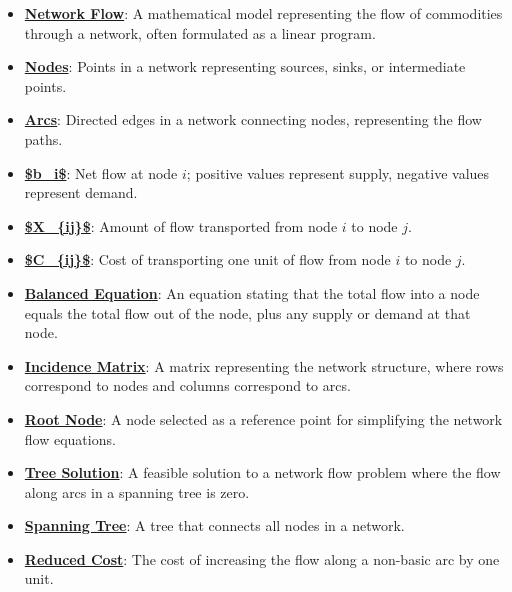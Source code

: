 \documentclass{article}%
\begin{document}
\begin{itemize}[leftmargin=*]%
\item \href{https://www.math.purdue.edu/~yipn/421//2024-11-05-NetFlows.pdf#page=1}{\textbf{Network Flow}}: A mathematical model representing the flow of commodities through a network, often formulated as a linear program.%
\item \href{https://www.math.purdue.edu/~yipn/421//2024-11-05-NetFlows.pdf#page=1}{\textbf{Nodes}}: Points in a network representing sources, sinks, or intermediate points.%
\item \href{https://www.math.purdue.edu/~yipn/421//2024-11-05-NetFlows.pdf#page=1}{\textbf{Arcs}}: Directed edges in a network connecting nodes, representing the flow paths.%
\item \href{https://www.math.purdue.edu/~yipn/421//2024-11-05-NetFlows.pdf#page=2}{\textbf{\$b\_i\$}}: Net flow at node $i$; positive values represent supply, negative values represent demand.%
\item \href{https://www.math.purdue.edu/~yipn/421//2024-11-05-NetFlows.pdf#page=2}{\textbf{\$X\_\{ij\}\$}}: Amount of flow transported from node $i$ to node $j$.%
\item \href{https://www.math.purdue.edu/~yipn/421//2024-11-05-NetFlows.pdf#page=2}{\textbf{\$C\_\{ij\}\$}}: Cost of transporting one unit of flow from node $i$ to node $j$.%
\item \href{https://www.math.purdue.edu/~yipn/421//2024-11-05-NetFlows.pdf#page=3}{\textbf{Balanced Equation}}: An equation stating that the total flow into a node equals the total flow out of the node, plus any supply or demand at that node.%
\item \href{https://www.math.purdue.edu/~yipn/421//2024-11-05-NetFlows.pdf#page=4}{\textbf{Incidence Matrix}}: A matrix representing the network structure, where rows correspond to nodes and columns correspond to arcs.%
\item \href{https://www.math.purdue.edu/~yipn/421//2024-11-05-NetFlows.pdf#page=6}{\textbf{Root Node}}: A node selected as a reference point for simplifying the network flow equations.%
\item \href{https://www.math.purdue.edu/~yipn/421//2024-11-05-NetFlows.pdf#page=11}{\textbf{Tree Solution}}: A feasible solution to a network flow problem where the flow along arcs in a spanning tree is zero.%
\item \href{https://www.math.purdue.edu/~yipn/421//2024-11-05-NetFlows.pdf#page=10}{\textbf{Spanning Tree}}: A tree that connects all nodes in a network.%
\item \href{https://www.math.purdue.edu/~yipn/421//2024-11-05-NetFlows.pdf#page=22}{\textbf{Reduced Cost}}: The cost of increasing the flow along a non-basic arc by one unit.%
\end{itemize}%
\end{document}
